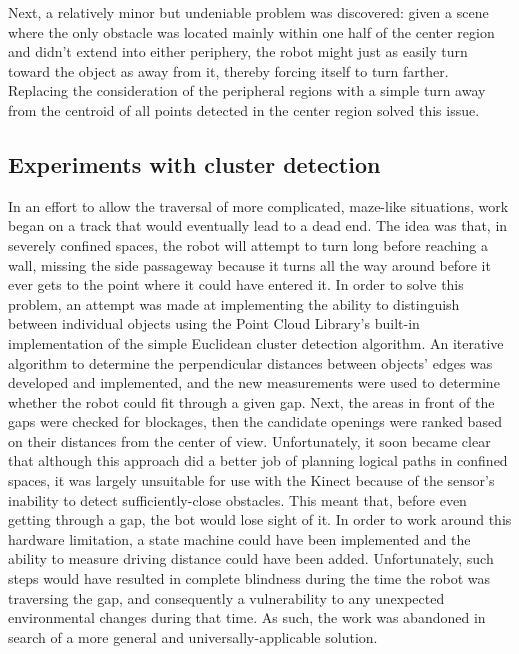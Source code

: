\documentclass[12pt]{report}
\begin{document}
Next, a relatively minor but undeniable problem was discovered: given a scene where the only obstacle was located mainly within one half of the center region and didn't extend into either periphery, the robot might just as easily turn toward the object as away from it, thereby forcing itself to turn farther.  Replacing the consideration of the peripheral regions with a simple turn away from the centroid of all points detected in the center region solved this issue.

\subsection[Cluster detection]{Experiments with cluster detection}
In an effort to allow the traversal of more complicated, maze-like situations, work began on a track that would eventually lead to a dead end.  The idea was that, in severely confined spaces, the robot will attempt to turn long before reaching a wall, missing the side passageway because it turns all the way around before it ever gets to the point where it could have entered it.  In order to solve this problem, an attempt was made at implementing the ability to distinguish between individual objects using the Point Cloud Library's built-in implementation of the simple Euclidean cluster detection algorithm.  An iterative algorithm to determine the perpendicular distances between objects' edges was developed and implemented, and the new measurements were used to determine whether the robot could fit through a given gap.  Next, the areas in front of the gaps were checked for blockages, then the candidate openings were ranked based on their distances from the center of view.  Unfortunately, it soon became clear that although this approach did a better job of planning logical paths in confined spaces, it was largely unsuitable for use with the Kinect because of the sensor's inability to detect sufficiently-close obstacles.  This meant that, before even getting through a gap, the bot would lose sight of it.  In order to work around this hardware limitation, a state machine could have been implemented and the ability to measure driving distance could have been added.  Unfortunately, such steps would have resulted in complete blindness during the time the robot was traversing the gap, and consequently a vulnerability to any unexpected environmental changes during that time.  As such, the work was abandoned in search of a more general and universally-applicable solution.
\end{document}
